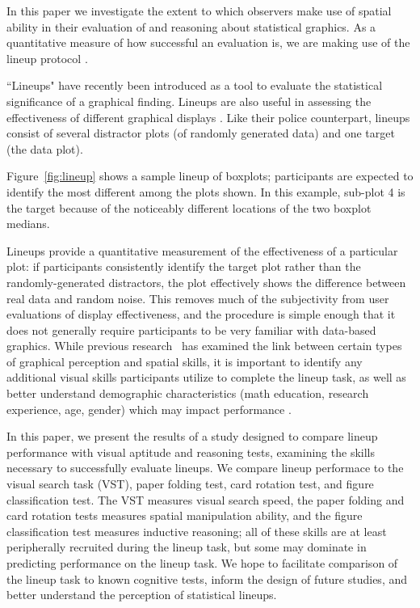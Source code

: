 \documentclass[journal]{vgtc}\usepackage[]{graphicx}\usepackage[]{color}
\begin{document}
In this paper we investigate the extent to which observers make use of spatial ability in their evaluation of and reasoning about statistical graphics. As a quantitative measure of how successful an evaluation is, we are making use of the lineup protocol  \cite{buja2009statistical, wickham2010graphical, majumder2013validation}. 

``Lineups" have recently been introduced as a tool to evaluate the statistical significance of a graphical finding. Lineups are also useful in assessing the effectiveness of different graphical displays \cite{hofmann2012graphical, loy:2015}. Like their police counterpart, lineups consist of several distractor plots (of randomly generated data) and one target (the data plot). 
% 
% 

Figure~\ref{fig:lineup} shows a sample lineup of boxplots; participants are expected to identify the most different among the plots shown. In this example, sub-plot 4 is the target  because of the noticeably different locations of the two boxplot medians.




Lineups provide a quantitative measurement of the effectiveness of a particular plot: if participants consistently identify the target plot rather than the randomly-generated distractors, the plot effectively shows the difference between real data and random noise. 
This removes much of the subjectivity from user evaluations of display effectiveness, and the procedure is simple enough that it does not generally require participants to be very familiar with data-based graphics. 
While previous research~\cite{lowrie2007solving,mayer1994whom} has examined the link between certain types of graphical perception and spatial skills, it is important to identify any additional visual skills participants utilize to complete the lineup task, as well as better understand demographic characteristics (math education, research experience, age, gender) which may impact performance \cite{humanfactorslineups}. 

In this paper, we present the results of a study designed to compare lineup performance with visual aptitude and reasoning tests, examining the skills necessary to successfully evaluate lineups. 
We compare lineup performace to the visual search task (VST), paper folding test, card rotation test, and figure classification test. 
The VST measures visual search speed\cite{goldstein1973validity}, the paper folding and card rotation tests measures spatial manipulation ability, and the figure classification test measures inductive reasoning\cite{ekstrom1976manual}; 
all of these skills are at least peripherally recruited during the lineup task, but some may dominate in predicting performance on the lineup task. 
We hope to facilitate comparison of the lineup task to known cognitive tests, inform the design of future studies, and better understand the perception of statistical lineups. 
\end{document}

